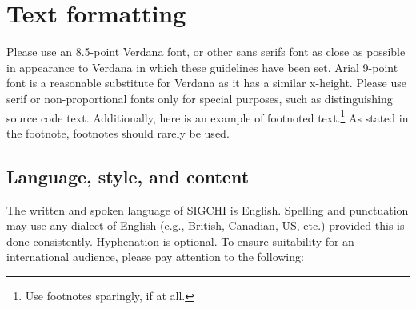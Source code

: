 \documentclass{chi-ext}
\begin{document}
\section{Text formatting}
Please use an 8.5-point Verdana font, or other sans serifs font as close as possible in appearance to Verdana in which these guidelines have been set.
Arial 9-point font is a reasonable substitute for Verdana as it has a similar x-height.
Please use serif or non-proportional fonts only for special purposes, such as distinguishing source code text.
Additionally, here is an example of footnoted text.\footnote{Use footnotes sparingly, if at all.}
As stated in the footnote, footnotes should rarely be used.

\subsection{Language, style, and content}
The written and spoken language of SIGCHI is English.
Spelling and punctuation may use any dialect of English (e.g., British, Canadian, US, etc.) provided this is done consistently.
Hyphenation is optional.
To ensure suitability for an international audience, please pay attention to the following:
\end{document}
